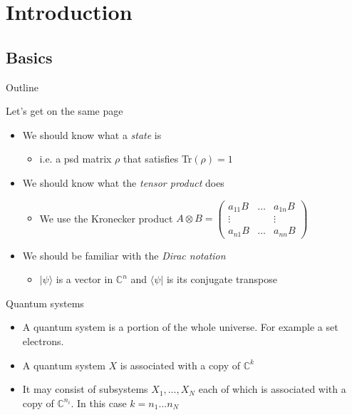 \section{Introduction}
\subsection{Basics}
\begin{frame}{Outline}
\tableofcontents[currentsection]
\end{frame}


\begin{frame}{Let's get on the same page}
 \begin{itemize}
  \item \large{We should know what a \textit{state} is} \pause
	\begin{itemize}  	
  	\item i.e. a psd matrix $\rho$ that satisfies Tr$(\rho)=1$ \pause 
	\end{itemize}
 \item \large{We should know what the \textit{tensor product} does} \pause
	\begin{itemize}
		   \item We use the Kronecker product  $A \otimes B = \begin{pmatrix}
a_{11}B & \dots & a_{1n}B \\
\vdots && \vdots \\
a_{n1}B & \dots & a_{nn}B
\end{pmatrix}$
	\end{itemize}  \pause
   \item \large{We should be familiar with the \textit{Dirac notation}} \pause
	\begin{itemize}	 
  	\item $\vert \psi \rangle$ is a vector in $\mathbb{C}^n$ and $\langle \psi \vert$ is its conjugate transpose
 \end{itemize}
 \end{itemize}\pause

\begin{block}{Quantum systems}
	\begin{itemize}
		\item A quantum system is a portion of the whole universe. For example a set electrons. 
		\item A quantum system $X$ is associated with a copy of $\mathbb{C}^k$ 
		\item It may consist of subsystems $X_1, \dots , X_N$ each of which is associated with a copy of $\mathbb{C}^{n_i}$. In this case $k = n_1 \dots n_N$
	\end{itemize}
\end{block}

\end{frame}

